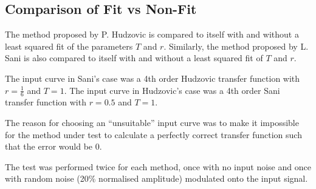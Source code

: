 \subsection{Comparison of Fit vs Non-Fit}

The method proposed by P. Hudzovic is compared  to  itself  with  and  without a
least squared fit of the parameters $T$ and  $r$. Similarly, the method proposed
by  L.  Sani is also compared to itself with and without a least squared fit  of
$T$ and $r$.

The input curve in Sani's case  was  a 4th order Hudzovic transfer function with
$r=\frac{1}{6}$ and $T=1$.  The  input  curve in Hudzovic's case was a 4th order
Sani transfer function with $r=0.5$  and  $T=1$.

The reason for choosing an ``unsuitable'' input curve was to  make it impossible
for the method  under  test  to  calculate a perfectly correct transfer function
such that the error would be 0.

The test was performed twice for  each method, once with no input noise and once
with  random noise (20\% normalised amplitude) modulated onto the input  signal.

